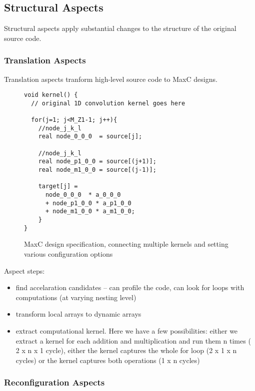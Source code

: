 \subsection{Structural Aspects}

Structural aspects apply substantial changes to the structure of the
original source code. 

\subsubsection{Translation Aspects}

Translation aspects tranform high-level source code to MaxC designs.

\begin{figure}
\centering
\begin{lstlisting}
void kernel() {
  // original 1D convolution kernel goes here

  for(j=1; j<M_Z1-1; j++){
    //node_j_k_l
    real node_0_0_0  = source[j];

    //node_j_k_l
    real node_p1_0_0 = source[(j+1)];
    real node_m1_0_0 = source[(j-1)];

    target[j] =
      node_0_0_0  * a_0_0_0
      + node_p1_0_0 * a_p1_0_0
      + node_m1_0_0 * a_m1_0_0;
    }
}
\end{lstlisting}
\caption{MaxC design specification, connecting multiple
    kernels and setting various configuration options}
\label{fig:maxc-design}
\end{figure}

Aspect steps:
\begin{itemize}
\item find accelaration candidates -- can profile the code, can look
  for loops with computations (at varying nesting level)

\item transform local arrays to dynamic arrays

\item extract computational kernel. Here we have a few
  possibilities: either we extract a kernel for each addition and
  multiplication and run them n times ( 2 x n x 1 cycle), either the
  kernel captures the whole for loop (2 x 1 x n cycles) or the kernel
  captures both operations (1 x n cycles)
\end{itemize}

\subsubsection{Reconfiguration Aspects}

